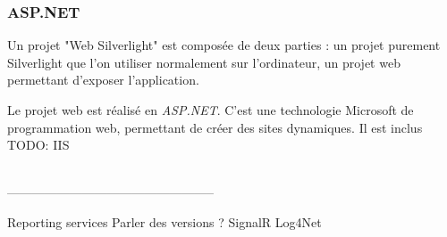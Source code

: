\subsubsection{ASP.NET}

Un projet "Web Silverlight" est composée de deux parties : un projet purement Silverlight que l'on utiliser normalement sur l'ordinateur, un projet web permettant d'exposer l'application.

Le projet web est réalisé en \textit{ASP.NET}. C'est une technologie Microsoft de programmation web, permettant de créer des sites dynamiques. Il est inclus
TODO: IIS


~~\\--------------------------------------------------

Reporting services
Parler des versions ?
SignalR
Log4Net